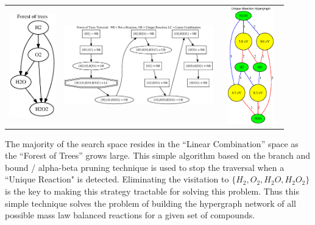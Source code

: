 \documentclass{article}
\begin{document}
\noindent
\begin{tabular}{l | c | r}
\includegraphics[width=2cm, height =5.1cm]{ForestTrees.eps}
&
\includegraphics[width=6.5cm, height =5.1cm]{traversal.eps}
&
\includegraphics[width=2.5cm, height =5.1cm]{hypergraph.eps}
\\
\end{tabular}

The majority of the search space resides in the ``Linear Combination'' space as the ``Forest of Trees'' grows large. This simple algorithm based on the branch and bound / alpha-beta pruning technique is used to stop the traversal when a ``Unique Reaction" is detected.\cite{BRANCH} Eliminating the visitation to $\{H_2,O_2,H_2O,H_2O_2\}$ is the key to making this strategy tractable for solving this problem. Thus this simple technique solves the problem of building the hypergraph network of all possible mass law balanced reactions for a given set of compounds. \\
\end{document}
